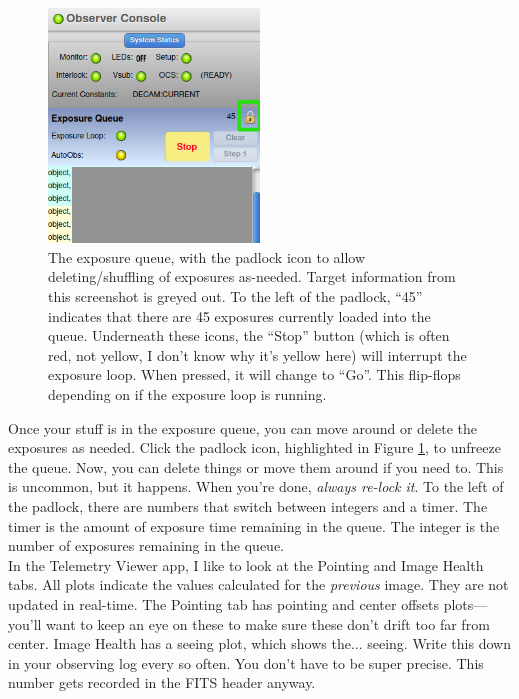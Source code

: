 \begin{figure}
    \centering
    \includegraphics[width=0.5\textwidth]{figs/observing/unlock.png}
    \caption{The exposure queue, with the padlock icon to allow deleting/shuffling of exposures as-needed. Target information from this screenshot is greyed out. To the left of the padlock, ``45'' indicates that there are 45 exposures currently loaded into the queue. Underneath these icons, the ``Stop'' button (which is often red, not yellow, I don't know why it's yellow here) will interrupt the exposure loop. When pressed, it will change to ``Go''. This flip-flops depending on if the exposure loop is running.}
    \label{fig:unlock}
\end{figure}

Once your stuff is in the exposure queue, you can move around or delete the exposures as needed. Click the padlock icon, highlighted in Figure \ref{fig:unlock}, to unfreeze the queue. Now, you can delete things or move them around if you need to. This is uncommon, but it happens. When you're done, \textit{always re-lock it}. To the left of the padlock, there are numbers that switch between integers and a timer. The timer is the amount of exposure time remaining in the queue. The integer is the number of exposures remaining in the queue. \\

In the Telemetry Viewer app, I like to look at the Pointing and Image Health tabs. All plots indicate the values calculated for the \textit{previous} image. They are not updated in real-time. The Pointing tab has pointing and center offsets plots---you'll want to keep an eye on these to make sure these don't drift too far from center. Image Health has a seeing plot, which shows the... seeing. Write this down in your observing log every so often. You don't have to be super precise. This number gets recorded in the FITS header anyway. \\

